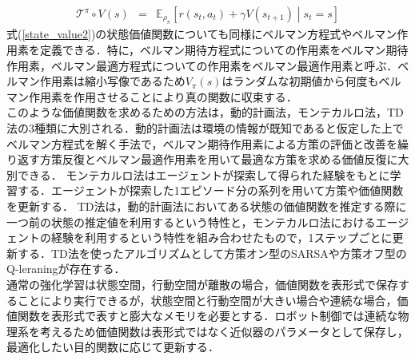 \documentclass[dvipdfmx]{ampbt_nomag}
\begin{document}
\begin{eqnarray} \label{bellman_operator}
  \mathcal{T}^\pi\circ V(s) &=&  \mathbb{E}_{\rho_\pi} \left[ r(s_t,a_t) + \gamma V(s_{t+1}) \middle|s_t = s\right]
\end{eqnarray}
式(\ref{state_value2})の状態価値関数についても同様にベルマン方程式やベルマン作用素を定義できる．特に，ベルマン期待方程式についての作用素をベルマン期待作用素，ベルマン最適方程式についての作用素をベルマン最適作用素と呼ぶ．ベルマン作用素は縮小写像であるため$V_\pi(s)$はランダムな初期値から何度もベルマン作用素を作用させることにより真の関数に収束する．\\
このような価値関数を求めるための方法は，動的計画法，モンテカルロ法，TD法の3種類に大別される．動的計画法は環境の情報が既知であると仮定した上でベルマン方程式を解く手法で，ベルマン期待作用素による方策の評価と改善を繰り返す方策反復とベルマン最適作用素を用いて最適な方策を求める価値反復に大別できる．
モンテカルロ法はエージェントが探索して得られた経験をもとに学習する．エージェントが探索した1エピソード分の系列を用いて方策や価値関数を更新する．
TD法は，動的計画法においてある状態の価値関数を推定する際に一つ前の状態の推定値を利用するという特性と，モンテカルロ法におけるエージェントの経験を利用するという特性を組み合わせたもので，1ステップごとに更新する．TD法を使ったアルゴリズムとして方策オン型のSARSAや方策オフ型のQ-leraningが存在する．\\
通常の強化学習は状態空間，行動空間が離散の場合，価値関数を表形式で保存することにより実行できるが，状態空間と行動空間が大きい場合や連続な場合，価値関数を表形式で表すと膨大なメモリを必要とする．ロボット制御では連続な物理系を考えるため価値関数は表形式ではなく近似器のパラメータとして保存し，最適化したい目的関数に応じて更新する．
\end{document}
